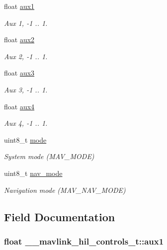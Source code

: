 \begin{DoxyCompactItemize}
float \hyperlink{struct____mavlink__hil__controls__t_ae8a7a69971e009abc390ed6f1950936a}{aux1}
\begin{DoxyCompactList}\small\item\em Aux 1, -\/1 .. 1. \end{DoxyCompactList}\item 
float \hyperlink{struct____mavlink__hil__controls__t_a34ee57a5807ad445506db9ba666e13d1}{aux2}
\begin{DoxyCompactList}\small\item\em Aux 2, -\/1 .. 1. \end{DoxyCompactList}\item 
float \hyperlink{struct____mavlink__hil__controls__t_ac90aa43f5be0ad189f9e42a4afec883f}{aux3}
\begin{DoxyCompactList}\small\item\em Aux 3, -\/1 .. 1. \end{DoxyCompactList}\item 
float \hyperlink{struct____mavlink__hil__controls__t_a0b636589ba52581e9e7cde07f8f90e12}{aux4}
\begin{DoxyCompactList}\small\item\em Aux 4, -\/1 .. 1. \end{DoxyCompactList}\item 
uint8\+\_\+t \hyperlink{struct____mavlink__hil__controls__t_a44828f146b2d8fa81c7da0e844a18e39}{mode}
\begin{DoxyCompactList}\small\item\em System mode (M\+A\+V\+\_\+\+M\+O\+D\+E) \end{DoxyCompactList}\item 
uint8\+\_\+t \hyperlink{struct____mavlink__hil__controls__t_adcc556cd52256501a39b1f9e962ca5b6}{nav\+\_\+mode}
\begin{DoxyCompactList}\small\item\em Navigation mode (M\+A\+V\+\_\+\+N\+A\+V\+\_\+\+M\+O\+D\+E) \end{DoxyCompactList}\end{DoxyCompactItemize}


\subsection{Field Documentation}
\hypertarget{struct____mavlink__hil__controls__t_ae8a7a69971e009abc390ed6f1950936a}{
\subsubsection[{aux1}]{\setlength{\rightskip}{0pt plus 5cm}float \+\_\+\+\_\+mavlink\+\_\+hil\+\_\+controls\+\_\+t\+::aux1}}\label{struct____mavlink__hil__controls__t_ae8a7a69971e009abc390ed6f1950936a}


